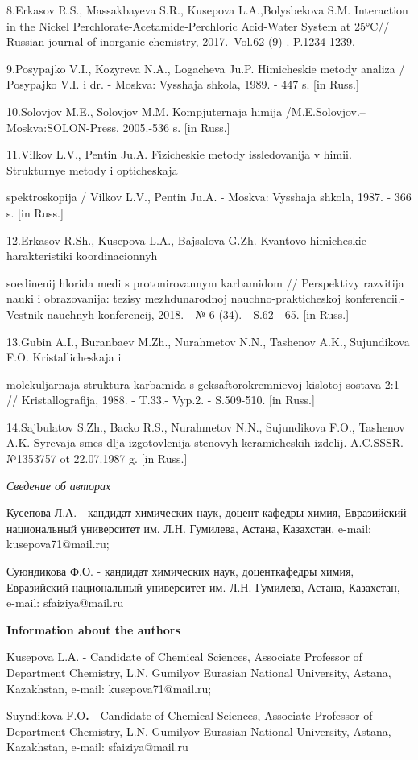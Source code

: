\begin{noparindent}
8.Erkasov R.S., Massakbayeva S.R., Kusepova L.A.,Bolysbekova S.M.
Interaction in the Nickel Perchlorate-Acetamide-Perchloric Acid-Water
System at 25°C// Russian journal of inorganic chemistry, 2017.--Vol.62
(9)-. P.1234-1239.

9.Posypajko V.I., Kozyreva N.A., Logacheva Ju.P. Himicheskie metody
analiza / Posypajko V.I. i dr. - Moskva: Vysshaja shkola, 1989. - 447 s.
{[}in Russ.{]}

10.Solov\textquotesingle jov M.E., Solov\textquotesingle jov M.M.
Komp\textquotesingle juternaja himija
/M.E.Solov\textquotesingle jov.--Moskva:SOLON-Press, 2005.-536 s. {[}in
Russ.{]}

11.Vilkov L.V., Pentin Ju.A. Fizicheskie metody issledovanija v himii.
Strukturnye metody i opticheskaja

spektroskopija / Vilkov L.V., Pentin
Ju.A. - Moskva: Vysshaja shkola, 1987. - 366 s. {[}in Russ.{]}

12.Erkasov R.Sh., Kusepova L.A., Bajsalova G.Zh. Kvantovo-himicheskie
harakteristiki koordinacionnyh

soedinenij hlorida medi s protonirovannym
karbamidom // Perspektivy razvitija nauki i obrazovanija: tezisy
mezhdunarodnoj nauchno-prakticheskoj konferencii.-Vestnik nauchnyh
konferencij, 2018. - № 6 (34). - S.62 - 65. {[}in Russ.{]}

13.Gubin A.I., Buranbaev M.Zh., Nurahmetov N.N., Tashenov A.K.,
Sujundikova F.O. Kristallicheskaja i

molekuljarnaja struktura karbamida
s geksaftorokremnievoj kislotoj sostava 2:1 // Kristallografija, 1988. -
T.33.- Vyp.2. - S.509-510. {[}in Russ.{]}

14.Sajbulatov S.Zh., Backo R.S., Nurahmetov N.N., Sujundikova F.O.,
Tashenov A.K. Syr\textquotesingle evaja smes\textquotesingle{} dlja
izgotovlenija stenovyh keramicheskih izdelij. A.C.SSSR. №1353757 ot
22.07.1987 g. {[}in Russ.{]}
\end{noparindent}

\emph{Сведение об авторах}

\begin{noparindent}
Кусепова Л.А. - кандидат химических наук, доцент кафедры химия,
Евразийский национальный университет им. Л.Н. Гумилева, Астана,
Казахстан, e-mail: kusepova71@mail.ru;

Суюндикова Ф.О. - кандидат химических наук, доценткафедры химия,
Евразийский национальный университет им. Л.Н. Гумилева, Астана,
Казахстан, e-mail: sfaiziya@mail.ru
\end{noparindent}

{\bfseries Information about the authors}

\begin{noparindent}
Kusepova L.А. - Candidate of Chemical Sciences, Associate Professor of
Department Chemistry, L.N. Gumilyov Eurasian National University,
Astana, Kazakhstan, e-mail: kusepova71@mail.ru;

Suyndikova F.O{\bfseries .} - Candidate of Chemical Sciences, Associate
Professor of Department Chemistry, L.N. Gumilyov Eurasian National
University, Astana, Kazakhstan, e-mail: sfaiziya@mail.ru
\end{noparindent}
